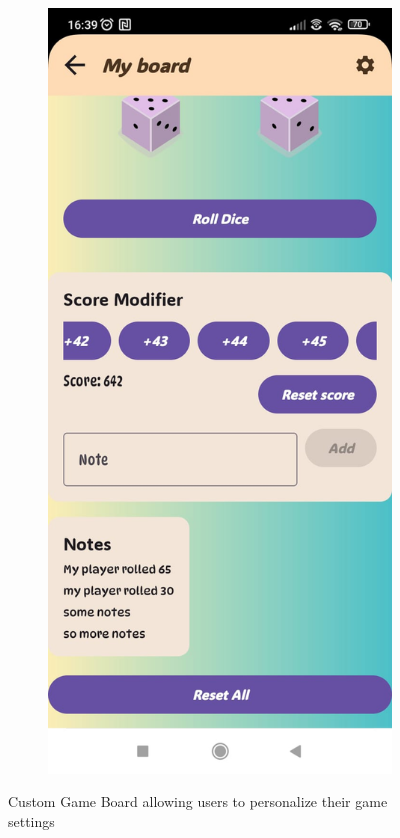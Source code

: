 \begin{figure}[ht!]
\begin{subfigure}[b]{0.26\textwidth}
    \end{subfigure} 
    \hspace{.5em}
    \begin{subfigure}[b]{0.26\textwidth}
        \includegraphics[width=\textwidth]{img/custom game.jpg}
    \end{subfigure}
    \caption{Custom Game Board allowing users to personalize their game settings}
\end{figure}

